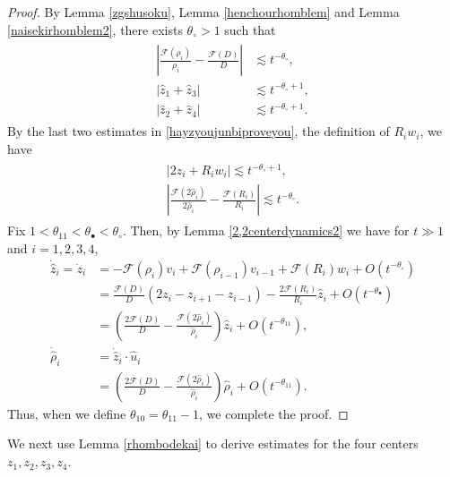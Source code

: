 \documentclass[reqno]{amsart}
\theoremstyle{plain}
\theoremstyle{definition}
\numberwithin{equation}{section}
\begin{document}
\begin{proof}
By Lemma \ref{zgshusoku}, Lemma \ref{henchourhomblem} and Lemma \ref{naisekirhomblem2}, there exists $\theta_{\circ}>1$ such that
\begin{align}\label{hayzyoujunbiproveyou}
\begin{aligned}
\left|\frac{\mathcal{F}(\rho_i)}{\rho_i}-\frac{\mathcal{F}(D)}{D}\right|&\lesssim t^{-\theta_{\circ}},
\\
\left|\hat{z}_1+\hat{z}_3\right|&\lesssim t^{-\theta_{\circ}+1},
\\
\left|\hat{z}_2+\hat{z}_4\right|&\lesssim t^{-\theta_{\circ}+1}.
\end{aligned}
\end{align}
By the last two estimates in \eqref{hayzyoujunbiproveyou}, the definition of $R_iw_i$, we have
\begin{align}\label{a}
\begin{aligned}
\left|2\hat{z}_i+R_iw_i\right|\lesssim t^{-\theta_{\circ}+1},
\\
\left|\frac{\mathcal{F}(2\hat{\rho}_i)}{2\hat{\rho}_i}-\frac{\mathcal{F}(R_i)}{R_i}\right|\lesssim t^{-\theta_{\circ}}.
\end{aligned}
\end{align}
Fix $1<\theta_{11}<\theta_{\bullet}<\theta_{\circ}$. Then, by Lemma \ref{2,2centerdynamics2} we have for $t\gg1$ and $i=1,2,3,4$,
\begin{align*}
\dot{\hat{z}}_i=\dot{z}_i&=-\mathcal{F}(\rho_i)v_i+\mathcal{F}(\rho_{i-1})v_{i-1}+\mathcal{F}(R_i)w_i+O\left(t^{-\theta_{\circ}}\right)
\\
&=\frac{\mathcal{F}(D)}{D}\left(2z_i-z_{i+1}-z_{i-1}\right)-\frac{2\mathcal{F}(R_i)}{R_i}\hat{z}_i+O\left(t^{-\theta_{\bullet}}\right)
\\
&=\left(\frac{2\mathcal{F}(D)}{D}-\frac{\mathcal{F}(2\hat{\rho}_i)}{\hat{\rho}_i}\right)\hat{z}_i+O\left(t^{-\theta_{11}}\right),
\\
\dot{\hat{\rho}}_i&=\dot{\hat{z}}_i\cdot \hat{u}_i
\\
&=\left(\frac{2\mathcal{F}(D)}{D}-\frac{\mathcal{F}(2\hat{\rho}_i)}{\hat{\rho}_i}\right)\hat{\rho}_i+O\left(t^{-\theta_{11}}\right).
\end{align*}
Thus, when we define $\theta_{10}=\theta_{11}-1$, we complete the proof.
\end{proof}


We next use Lemma \ref{rhombodekai} to derive estimates for the four centers $z_1,z_2,z_3,z_4$.
\end{document}
